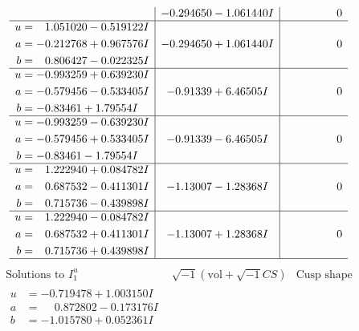 \documentclass[1p]{elsarticle_modified}
\theoremstyle{definition}
\newcommand{\I}{\sqrt{-1}}
\begin{document}
$$\begin{array}{c|c|c}
 & -0.294650 - 1.061440 I & \phantom{-0.000000 } 0 \\ \hline\begin{aligned}
u &= \phantom{-}1.051020 - 0.519122 I \\
a &= -0.212768 + 0.967576 I \\
b &= \phantom{-}0.806427 - 0.022325 I\end{aligned}
 & -0.294650 + 1.061440 I & \phantom{-0.000000 } 0 \\ \hline\begin{aligned}
u &= -0.993259 + 0.639230 I \\
a &= -0.579456 - 0.533405 I \\
b &= -0.83461 + 1.79554 I\end{aligned}
 & -0.91339 + 6.46505 I & \phantom{-0.000000 } 0 \\ \hline\begin{aligned}
u &= -0.993259 - 0.639230 I \\
a &= -0.579456 + 0.533405 I \\
b &= -0.83461 - 1.79554 I\end{aligned}
 & -0.91339 - 6.46505 I & \phantom{-0.000000 } 0 \\ \hline\begin{aligned}
u &= \phantom{-}1.222940 + 0.084782 I \\
a &= \phantom{-}0.687532 - 0.411301 I \\
b &= \phantom{-}0.715736 - 0.439898 I\end{aligned}
 & -1.13007 - 1.28368 I & \phantom{-0.000000 } 0 \\ \hline\begin{aligned}
u &= \phantom{-}1.222940 - 0.084782 I \\
a &= \phantom{-}0.687532 + 0.411301 I \\
b &= \phantom{-}0.715736 + 0.439898 I\end{aligned}
 & -1.13007 + 1.28368 I & \phantom{-0.000000 } 0\\
 \hline 
 \end{array}$$\newpage$$\begin{array}{c|c|c}  
\text{Solutions to }I^u_{1}& \I (\text{vol} + \sqrt{-1}CS) & \text{Cusp shape}\\
 \hline 
\begin{aligned}
u &= -0.719478 + 1.003150 I \\
a &= \phantom{-}0.872802 - 0.173176 I \\
b &= -1.015780 + 0.052361 I\end{aligned}

\end{array}$$
\end{document}
